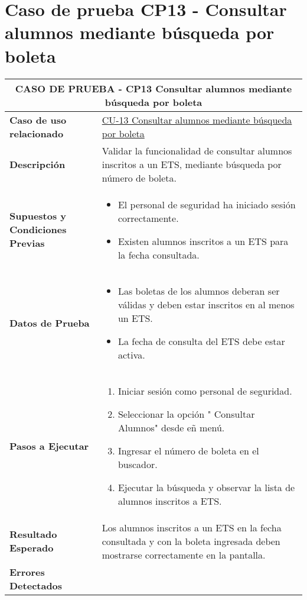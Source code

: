 \section{Caso de prueba CP13 - Consultar alumnos mediante búsqueda por boleta}

\begin{longtable}{|p{5cm}|p{10cm}|}
	\hline
	\multicolumn{2}{|c|}{\textbf{CASO DE PRUEBA - CP13 Consultar alumnos mediante búsqueda por boleta}} \\
	\hline
	\textbf{Caso de uso relacionado} & \hyperref[CU-13]{CU-13 Consultar alumnos mediante búsqueda por boleta} \\
	\hline
	\textbf{Descripción} & Validar la funcionalidad de consultar alumnos inscritos a un ETS, mediante búsqueda por número de boleta. \\
	\hline
	\textbf{Supuestos y Condiciones Previas} & 
	\begin{itemize}
		\item El personal de seguridad ha iniciado sesión correctamente.
		\item Existen alumnos inscritos a un ETS para la fecha consultada.
	\end{itemize} \\
	\hline
	\textbf{Datos de Prueba} & 
	\begin{itemize}
		\item Las boletas de los alumnos deberan ser válidas y deben estar inscritos en al menos un ETS.
		\item La fecha de consulta del ETS debe estar activa.
	\end{itemize} \\
	\hline
	\textbf{Pasos a Ejecutar} & 
	\begin{enumerate}
		\item Iniciar sesión como personal de seguridad.
		\item Seleccionar la opción " Consultar Alumnos" desde eñ menú.
		\item Ingresar el número de boleta en el buscador.
		\item Ejecutar la búsqueda y observar la lista de alumnos inscritos a ETS.
	\end{enumerate} \\
	\hline
	\textbf{Resultado Esperado} & 
	Los alumnos inscritos a un ETS en la fecha consultada y con la boleta ingresada deben mostrarse correctamente en la pantalla. \\
	\hline
	\textbf{Errores Detectados} &
	\begin{itemize}

\end{itemize}
\end{longtable}
